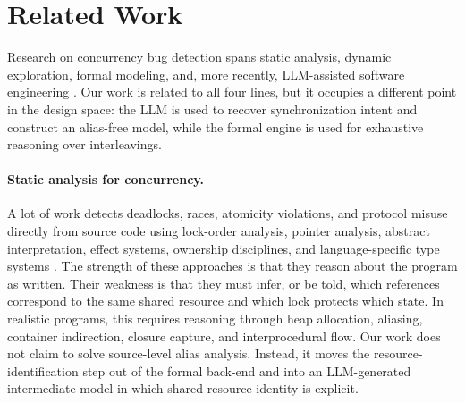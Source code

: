 \section{Related Work}
\label{sec:related}

Research on concurrency bug detection spans static analysis, dynamic exploration, formal modeling, and, more recently, LLM-assisted software engineering \cite{Engler2003RacerX,Godefroid1997VeriSoft,Murata1989PetriNets,Fan2023RepairFromLLMs,Xia2023APRLLMs}. Our work is related to all four lines, but it occupies a different point in the design space: the LLM is used to recover synchronization intent and construct an alias-free model, while the formal engine is used for exhaustive reasoning over interleavings.
\paragraph{Static analysis for concurrency.}
A lot of work detects deadlocks, races, atomicity violations, and protocol misuse directly from source code using lock-order analysis, pointer analysis, abstract interpretation, effect systems, ownership disciplines, and language-specific type systems \cite{Engler2003RacerX,Flanagan2000TypeBasedRace,Flanagan2003Atomicity,Boyapati2002Ownership,Pratikakis2006Locksmith,Naik2006StaticRaceJava}. The strength of these approaches is that they reason about the program as written. Their weakness is that they must infer, or be told, which references correspond to the same shared resource and which lock protects which state. In realistic programs, this requires reasoning through heap allocation, aliasing, container indirection, closure capture, and interprocedural flow. Our work does not claim to solve source-level alias analysis. Instead, it moves the resource-identification step out of the formal back-end and into an LLM-generated intermediate model in which shared-resource identity is explicit.

